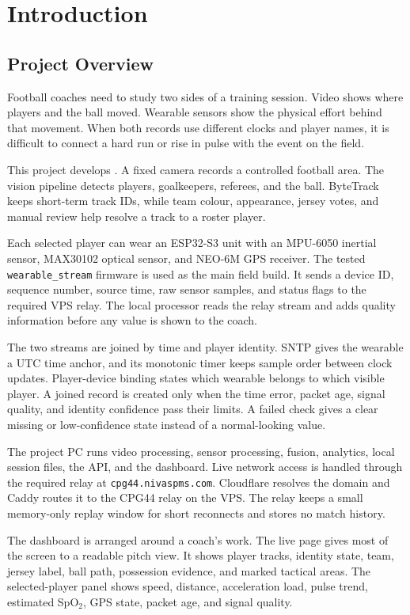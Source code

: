 \section{Introduction}

\subsection{Project Overview}
Football coaches need to study two sides of a training session. Video shows
where players and the ball moved. Wearable sensors show the physical effort
behind that movement. When both records use different clocks and player names,
it is difficult to connect a hard run or rise in pulse with the event on the
field.

This project develops \systemname. A fixed camera records a controlled football
area. The vision pipeline detects players, goalkeepers, referees, and the ball.
ByteTrack keeps short-term track IDs, while team colour, appearance, jersey
votes, and manual review help resolve a track to a roster player.

Each selected player can wear an ESP32-S3 unit with an MPU-6050 inertial sensor,
MAX30102 optical sensor, and NEO-6M GPS receiver. The tested
\texttt{wearable\_stream} firmware is used as the main field build. It sends a
device ID, sequence number, source time, raw sensor samples, and status flags
to the required VPS relay. The local processor reads the relay stream and adds
quality information before any value is shown to the coach.

The two streams are joined by time and player identity. SNTP gives the wearable
a UTC time anchor, and its monotonic timer keeps sample order between clock
updates. Player-device binding states which
wearable belongs to which visible player. A joined record is created only when
the time error, packet age, signal quality, and identity confidence pass their
limits. A failed check gives a clear missing or low-confidence state instead of
a normal-looking value.

The project PC runs video processing, sensor processing, fusion, analytics,
local session files, the API, and the dashboard. Live network access is handled
through the required relay at \texttt{cpg44.nivaspms.com}. Cloudflare resolves
the domain and Caddy routes it to the CPG44 relay on the VPS. The relay keeps a
small memory-only replay window for short reconnects and stores no match
history.

The dashboard is arranged around a coach's work. The live page gives most of
the screen to a readable pitch view. It shows player tracks, identity state,
team, jersey label, ball path, possession evidence, and marked tactical areas.
The selected-player panel shows speed, distance, acceleration load, pulse
trend, estimated SpO$_2$, GPS state, packet age, and signal quality.

